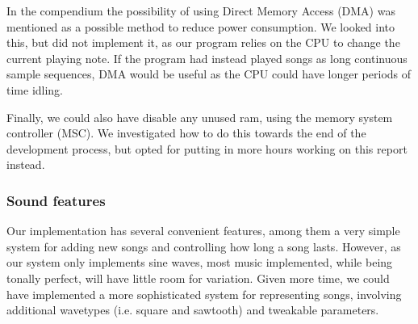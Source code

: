 In the compendium the possibility of using Direct Memory Access (DMA) was mentioned as a possible method to reduce power consumption. We looked into this, but did not implement it, as our program relies on the CPU to change the current playing note. If the program had instead played songs as long continuous sample sequences, DMA would be useful as the CPU could have longer periods of time idling.

Finally, we could also have disable any unused ram, using the memory system controller (MSC). We investigated how to do this towards the end of the development process, but opted for putting in more hours working on this report instead.

\subsubsection{Sound features}

Our implementation has several convenient features, among them a very simple system for adding new songs and controlling how long a song lasts. However, as our system only implements sine waves, most music implemented, while being tonally perfect, will have little room for variation. Given more time, we could have implemented a more sophisticated system for representing songs, involving additional wavetypes (i.e. square and sawtooth) and tweakable parameters.
